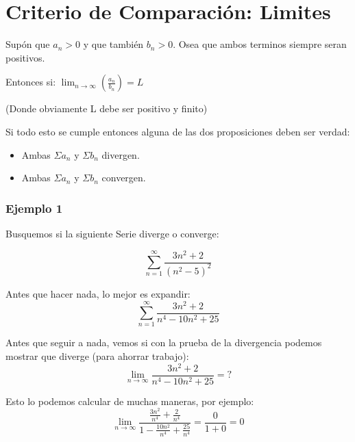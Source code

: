 \documentclass[12pt]{report}                                %
\begin{document}
    \section{Criterio de Comparación: Limites}

        Supón que $a _n > 0$ y que también $b_n > 0$. Osea que ambos terminos siempre seran positivos.

        Entonces si:
        $\lim_{n \to \infty} \left( \frac{a_n}{b_n} \right) = L$

        (Donde obviamente L debe ser positivo y finito)

        Si todo esto se cumple entonces alguna de las dos proposiciones deben ser verdad:
        \begin{itemize}
            \item Ambas $\Sigma a_n$ y $\Sigma b_n$ divergen.
            \item Ambas $\Sigma a_n$ y $\Sigma b_n$ convergen.
        \end{itemize}

        \subsubsection{Ejemplo 1}
            Busquemos si la siguiente Serie diverge o converge:

            \begin{equation*}
                \sum_{n=1}^{\infty} \frac{3n^2+2}{(n^2-5)^2}
            \end{equation*}

            Antes que hacer nada, lo mejor es expandir:
            \begin{equation*}
                \sum_{n=1}^{\infty} \frac{3n^2+2}{n^4-10n^2+25}
            \end{equation*}
             
            Antes que seguir a nada, vemos si con la prueba de la divergencia podemos mostrar que diverge
            (para ahorrar trabajo):
            \begin{equation*}
                \lim_{n \to \infty} \frac{3n^2+2}{n^4-10n^2+25} = ?
            \end{equation*}

            Esto lo podemos calcular de muchas maneras, por ejemplo:
            \begin{equation*}
                \lim_{n \to \infty} \frac{ \frac{3n^2}{n^4} +\frac{2}{n^4}  }{ 1 - \frac{10n^2}{n^4} + \frac{25}{n^4} } = \frac{0}{1+0} = 0
            \end{equation*}
\end{document}
